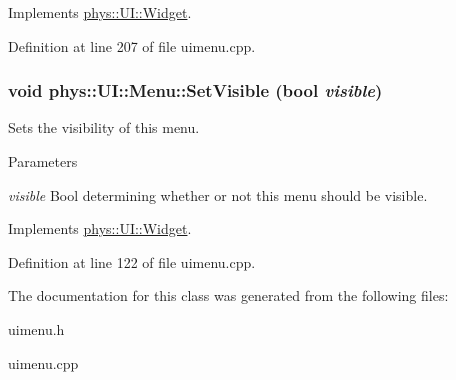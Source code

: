 Implements \hyperlink{classphys_1_1UI_1_1Widget_a3fe0b767fea59e1d120ed37b26c99044}{phys::UI::Widget}.



Definition at line 207 of file uimenu.cpp.

\hypertarget{classphys_1_1UI_1_1Menu_a4847e0de055a9c2f708f98742fa59a87}{
\subsubsection[{SetVisible}]{\setlength{\rightskip}{0pt plus 5cm}void phys::UI::Menu::SetVisible (bool {\em visible})}}
\label{d6/dd3/classphys_1_1UI_1_1Menu_a4847e0de055a9c2f708f98742fa59a87}


Sets the visibility of this menu. 


\begin{DoxyParams}{Parameters}
\item[{\em visible}]Bool determining whether or not this menu should be visible. \end{DoxyParams}


Implements \hyperlink{classphys_1_1UI_1_1Widget_ab049233d8d5522a6ab42654b8924a3e0}{phys::UI::Widget}.



Definition at line 122 of file uimenu.cpp.



The documentation for this class was generated from the following files:\begin{DoxyCompactItemize}
\item 
uimenu.h\item 
uimenu.cpp\end{DoxyCompactItemize}
